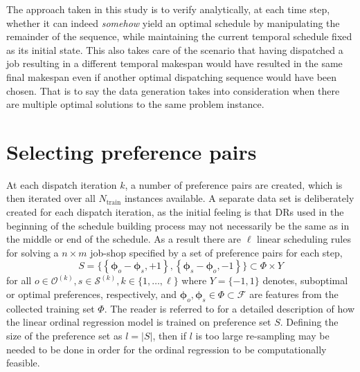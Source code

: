 \documentclass[smallextended]{llncs}
\newcommand{\vphi}{{\boldsymbol{\phi}}}
\begin{document}
The approach taken in this study is to verify analytically, at each time step, whether it can indeed \emph{somehow} yield an optimal schedule by manipulating the remainder of the sequence, while maintaining the current temporal schedule fixed as its initial state. This also takes care of the scenario that having dispatched a job resulting in a different temporal makespan would have resulted in the same final makespan even if another optimal dispatching sequence would have been chosen. That is to say the data generation takes into consideration when there are multiple optimal solutions to the same problem instance. 

\section{Selecting preference pairs}\label{sec:strategy}
At each dispatch iteration $k$, a number of preference pairs are created, which is then iterated over all $N_{\text{train}}$ instances available. A separate data set is deliberately created for each dispatch iteration, as the initial feeling is that DRs used in the beginning of the schedule building process may not necessarily be the same as in the middle or end of the schedule. As a result there are $\ell$ linear scheduling rules for solving a $n \times m$ job-shop specified by a set of preference pairs for each step,  
\begin{equation}
S = \big\{\left\{\vphi_o-\vphi_s,+1\right\},\left\{\vphi_s-\vphi_o,-1\right\}\big\} \subset \Phi\times {Y}  \label{eq:Sjssp}
\end{equation}
for all $o\in \mathcal{O}^{(k)},s\in \mathcal{S}^{(k)}, k\in\{1,\ldots,\ell\}$ where $Y=\{-1,1\}$ denotes, suboptimal or optimal preferences, respectively, and $\vphi_o,\vphi_s\in\Phi\subset\mathcal{F}$ are features from the collected training set $\Phi$.
The reader is referred to \cite{InRu11a} for a detailed description of how the linear ordinal regression model is trained on preference set $S$. Defining the size of the preference set as $l=\left|S\right|$, then if  $l$ is too large re-sampling may be needed to be done in order for the ordinal regression to be computationally feasible. 

\end{document}
